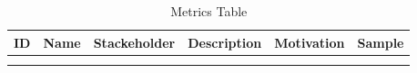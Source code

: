 \begin{table*}[p]
\caption{Metrics Table}
\begin{scriptsize}
\label{T:metrics}
\bigskip
\begin{center}
\begin{tabular}{lp{}p{}p{}p{}p{}}
\hline
ID & Name & Stackeholder & Description & Motivation & Sample \\
\hline
 \rowcolor{blue!20} \multicolumn{6}{l}{\bf Unordered metrics} \\
\hline
 & & & & & \\
\end{tabular}
\end{center}
\end{scriptsize}
\end{table*}
